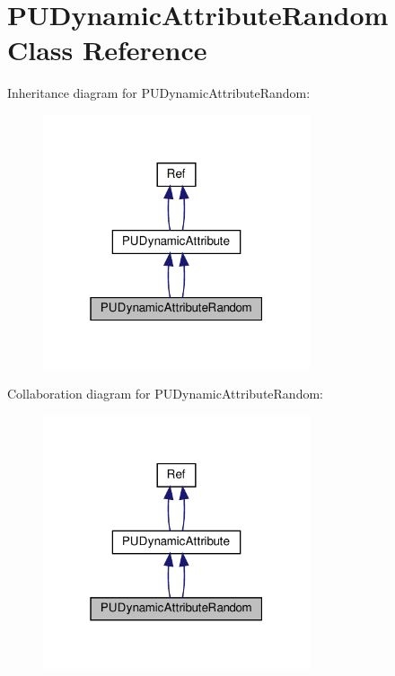 \hypertarget{classPUDynamicAttributeRandom}{}\section{P\+U\+Dynamic\+Attribute\+Random Class Reference}
\label{classPUDynamicAttributeRandom}


Inheritance diagram for P\+U\+Dynamic\+Attribute\+Random\+:
\nopagebreak
\begin{figure}[H]
\begin{center}
\leavevmode
\includegraphics[width=223pt]{classPUDynamicAttributeRandom__inherit__graph}
\end{center}
\end{figure}


Collaboration diagram for P\+U\+Dynamic\+Attribute\+Random\+:
\nopagebreak
\begin{figure}[H]
\begin{center}
\leavevmode
\includegraphics[width=223pt]{classPUDynamicAttributeRandom__coll__graph}
\end{center}
\end{figure}
